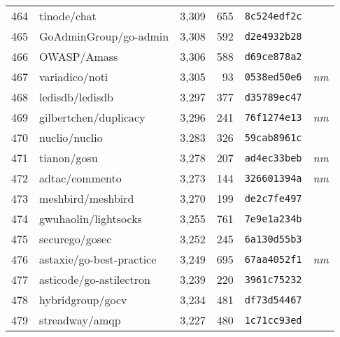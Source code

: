 {\begin{supertabular}{llrrll}
        464 &                        tinode/chat &  3,309 &    655 &  \texttt{8c524edf2c} &              \\
        465 &              GoAdminGroup/go-admin &  3,308 &    592 &  \texttt{d2e4932b28} &              \\
        466 &                        OWASP/Amass &  3,306 &    588 &  \texttt{d69ce878a2} &              \\
        467 &                     variadico/noti &  3,305 &     93 &  \texttt{0538ed50e6} &  \textit{nm} \\
        468 &                    ledisdb/ledisdb &  3,297 &    377 &  \texttt{d35789ec47} &              \\
        469 &              gilbertchen/duplicacy &  3,296 &    241 &  \texttt{76f1274e13} &  \textit{nm} \\
        470 &                      nuclio/nuclio &  3,283 &    326 &  \texttt{59cab8961c} &              \\
        471 &                        tianon/gosu &  3,278 &    207 &  \texttt{ad4ec33beb} &  \textit{nm} \\
        472 &                     adtac/commento &  3,273 &    144 &  \texttt{326601394a} &  \textit{nm} \\
        473 &                  meshbird/meshbird &  3,270 &    199 &  \texttt{de2c7fe497} &              \\
        474 &               gwuhaolin/lightsocks &  3,255 &    761 &  \texttt{7e9e1a234b} &              \\
        475 &                     securego/gosec &  3,252 &    245 &  \texttt{6a130d55b3} &              \\
        476 &           astaxie/go-best-practice &  3,249 &    695 &  \texttt{67aa4052f1} &  \textit{nm} \\
        477 &            asticode/go-astilectron &  3,239 &    220 &  \texttt{3961c75232} &              \\
        478 &                   hybridgroup/gocv &  3,234 &    481 &  \texttt{df73d54467} &              \\
        479 &                     streadway/amqp &  3,227 &    480 &  \texttt{1c71cc93ed} &              \\

\end{supertabular}}
